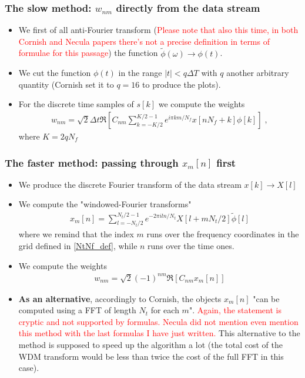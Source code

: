 \documentclass{article}
\begin{document}
\subsubsection{The slow method: $w_{nm}$ directly from the data stream}
\begin{itemize}
    \item We first of all anti-Fourier transform (\textcolor{red}{Please note that also this time, in both Cornish and Necula papers there's not a precise definition in terms of formulae for this passage}) the function $\tilde \phi(\omega)\to\phi(t)$.
    \item We cut the function $\phi(t)$ in the range $|t|<q\Delta T$ with $q$ another arbitrary quantity (Cornish set it to $q=16$ to produce the plots).
    \item For the discrete time samples of $s[k]$ we compute the weights
    \begin{align}
    \label{eq:direct}
w_{n m}=\sqrt{2} \Delta t \Re \left[C_{n m} \sum_{k=-K / 2}^{K / 2-1} e^{i \pi k m / N_f} x\left[n N_f+k\right] \phi[k]\right]\;,
\end{align}
where $K=2qN_f$
\end{itemize}
\subsubsection{The faster method: passing through $x_m[n]$ first}
\begin{itemize}
    \item We produce the discrete Fourier transform of the data stream $x[k]\to X[l]$
    \item We compute the "windowed-Fourier transforms"
    \begin{align}
    \label{eq:wdft}
        x_m[n]=\sum_{l=-N_t/2}^{N_t/2-1}e^{-2\pi iln/N_t}X[l+mN_t/2]\tilde\phi[l]
    \end{align}
    where we remind that the index $m$ runs over the frequency coordinates in the grid defined in \eqref{NtNf_def}, while $n$ runs over the time ones.
    \item We compute the weights
    \begin{align}
    \label{eq:fast}
        w_{nm}=\sqrt{2}(-1)^{nm}\Re\left[C_{nm}x_m[n]\right]
    \end{align}
    \item \textbf{As an alternative}, accordingly to Cornish, the objects $x_m[n]$ "can be computed using a
    FFT of length $N_t$ for each $m$". \textcolor{red}{Again, the statement is cryptic and not supported by formulas. Necula did not mention even mention this method with the last formulas I have just written.} This alternative to the method is supposed to speed up the algorithm a lot (the total cost of the WDM transform would be less than twice the cost of the full FFT in this case).
\end{itemize}
\end{document}
